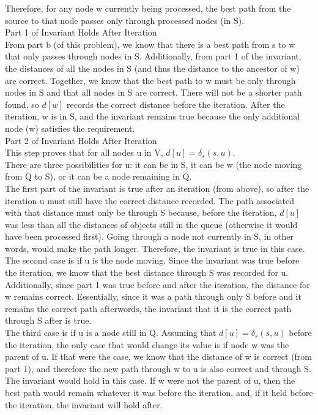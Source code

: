 \documentclass[12pt,twoside]{article}
\begin{document}
\begin{problems}
\begin{problemparts}
Therefore, for any node w currently being processed, the best path from the source to that node passes only through processed nodes (in S).\\

\problempart Part 1 of Invariant Holds After Iteration\\
From part b (of this problem), we know that there is a best path from s to w that only passes through nodes in S.  Additionally, from part 1 of the invariant, the distances of all the nodes in S (and thus the distance to the ancestor of w) are correct.  Together, we know that the best path to w must be only through nodes in S and that all nodes in S are correct. There will not be a shorter path found, so $d[w]$ records the correct distance before the iteration.  After the iteration, w is in S, and the invariant remains true because the only additional node (w) satisfies the requirement.\\

\problempart Part 2 of Invariant Holds After Iteration\\
This step proves that for all nodes u in V, $d[u] = \delta_s(s,u)$.\\

There are three possibilities for u: it can be in S, it can be w (the node moving from Q to S), or it can be a node remaining in Q.\\

The first part of the invariant is true after an iteration (from above), so after the iteration u must still have the correct distance recorded.  The path associated with that distance must only be through S because, before the iteration, $d[u]$ was less than all the distances of objects still in the queue (otherwise it would have been processed first).  Going through a node not currently in S, in other words, would make the path longer.  Therefore, the invariant is true in this case.\\

The second case is if u is the node moving.  Since the invariant was true before the iteration, we know that the best distance through S was recorded for u.  Additionally, since part 1 was true before and after the iteration, the distance for w remains correct.  Essentially, since it was a path through only S before and it remains the correct path afterwords, the invariant that it is the correct path through S after is true.\\

The third case is if u is a node still in Q.  Assuming that $d[u] = \delta_s(s,u)$ before the iteration, the only case that would change its value is if node w was the parent of u.  If that were the case, we know that the distance of w is correct (from part 1), and therefore the new path through w to u is also correct and through S.  The invariant would hold in this case.  If w were not the parent of u, then the best path would remain whatever it was before the iteration, and, if it held before the iteration, the invariant will hold after.\\


\end{problemparts}
\end{problems}
\end{document}
